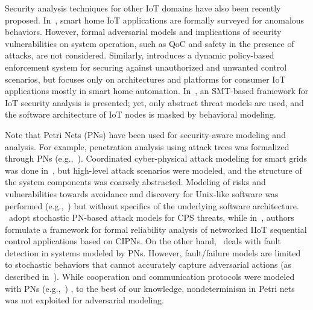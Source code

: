 Security analysis techniques for other IoT domains have also been recently proposed. In~\cite{soteria}, smart home IoT applications are formally surveyed for anomalous behaviors. However, formal adversarial models and implications of security vulnerabilities on  system operation, such as QoC and safety in the presence of attacks, are not considered. Similarly, \cite{celikiotguard} introduces a dynamic policy-based enforcement system for securing against unauthorized and unwanted control scenarios, but focuses only on architectures and platforms for consumer IoT applications mostly in smart home automation. In~\cite{iotsat}, an SMT-based framework for IoT security analysis is presented; yet, only abstract threat models are used, and the software architecture of IoT nodes is masked by behavioral modeling.

Note that Petri Nets (PNs) have been used for security-aware modeling and analysis.
For example, penetration analysis using attack trees was formalized through %
PNs (e.g.,~\cite{PNattackNets1,PNattackNets2}).
Coordinated cyber-physical attack modeling for smart grids was done in~\cite{PNgridAttacks}, but high-level attack scenarios were modeled, and the structure of the system components was coarsely abstracted. Modeling of risks and vulnerabilities towards avoidance and discovery for Unix-like software was performed (e.g.,~\cite{PNunixAttacks}) but without specifics of the underlying software architecture. \cite{SPNattacksCPS,SPNattacksGRID}~adopt stochastic PN-based attack models for CPS threats, while in~\cite{lesi_iotdi19}, authors formulate a framework for formal reliability analysis of networked IIoT sequential control applications based on CIPNs. On the other hand, \cite{petrinets_faults}~deals with fault detection in systems modeled by PNs. However, fault/failure models are limited to stochastic behaviors that cannot accurately capture adversarial actions (as described in~\cite{wang_arxiv19}). While cooperation and communication protocols were modeled with PNs (e.g.,~\cite{PNprotocols1,PNprotocols2})
, to the best of our knowledge, nondeterminism in Petri nets was not exploited for adversarial modeling.

